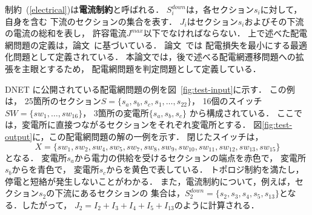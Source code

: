 制約~(\ref{electrical})は\textbf{電流制約}と呼ばれる．
$S_{i}^{down}$は，各セクション$s_{i}$に対して，自身を含む
下流のセクションの集合を表す．
$J_{i}$はセクション$s_{i}$およびその下流の電流の総和を表し，
許容電流$J^{max}$以下でなければならない．
%
上で述べた配電網問題の定義は，論文~\cite{Minato:dnet:ZDD}に基づいている．
論文~\cite{Minato:dnet:ZDD}では
配電損失を最小にする最適化問題として定義されている．
本論文では，後で述べる配電網遷移問題への拡張を主眼とするため，
配電網問題を判定問題として定義している．

\begin{figure}[tb]
\end{figure}
%  
\begin{figure}[tb]
\end{figure}

DNET
に公開されている配電網問題の例を図~\ref{fig:test-input}に示す．
この例は，
25箇所のセクション$S=\{s_{a},s_{b},s_{c},s_{1},\ldots, s_{22}\}$，
16個のスイッチ$SW=\{sw_{1},\ldots, sw_{16}\}$，
3箇所の変電所$\{s_{a}, s_{b}, s_{c}\}$
から構成されている．
ここでは，変電所に直接つながるセクションをそれぞれ変電所とする．
%
図\ref{fig:test-output}に，この配電網問題の解の一例を示す．
閉じたスイッチは，
\[X=\{sw_{1},sw_{2},sw_{4},sw_{5},sw_{7},sw_{8},sw_{9},%
sw_{10},sw_{11},sw_{12},sw_{13},sw_{15}\}\]
となる．
変電所$s_{a}$から電力の供給を受けるセクションの端点を赤色で，
変電所$s_{b}$からを青色で，
変電所$s_{c}$からを黄色で表している．
トポロジ制約を満たし，停電と短絡が発生しないことがわかる．
また，電流制約について，例えば，セクション$s_2$の下流にあるセクションの
集合は，$S_2^{down}=\{s_{2},s_{3},s_{4},s_{5},s_{13}\}$となる．したがって，
$J_{2}=I_{2}+I_{3}+I_{4}+I_{5}+I_{13}$のように計算される．

